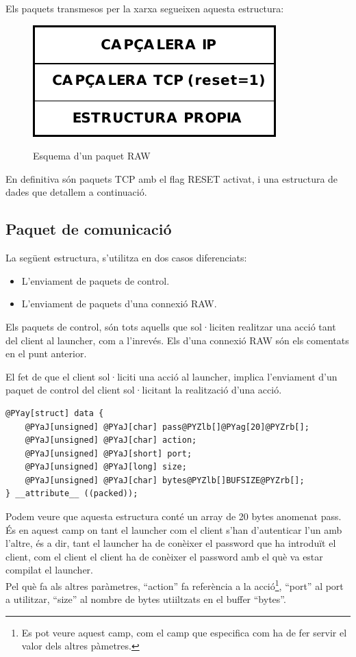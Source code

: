 Els paquets transmesos per la xarxa segueixen aquesta estructura: \\

\begin{figure}[htp]
    \centering
    \includegraphics[scale=1,keepaspectratio]{diagrames/solutionDesignPacketStructure.pdf} \\
    \caption{Esquema d'un paquet RAW}
    \label{fig:packetScheme}
\end{figure}

En definitiva són paquets TCP amb el flag RESET activat, i una estructura de dades que detallem a continuació.

\subsection{Paquet de comunicació}

La següent estructura, s'utilitza en dos casos diferenciats:
\begin{itemize}
    \item L'enviament de paquets de control.
    \item L'enviament de paquets d'una connexió RAW.
\end{itemize}

Els paquets de control, són tots aquells que sol·liciten realitzar una acció tant del client al launcher, com a l'inrevés.
Els d'una connexió RAW són els comentats en el punt anterior.

El fet de que el client sol·liciti una acció al launcher, implica l'enviament d'un paquet de control del client sol·licitant
la realització d'una acció. 

\begin{Verbatim}[commandchars=@\[\]]
@PYay[struct] data {
    @PYaJ[unsigned] @PYaJ[char] pass@PYZlb[]@PYag[20]@PYZrb[];
    @PYaJ[unsigned] @PYaJ[char] action;
    @PYaJ[unsigned] @PYaJ[short] port;
    @PYaJ[unsigned] @PYaJ[long] size;
    @PYaJ[unsigned] @PYaJ[char] bytes@PYZlb[]BUFSIZE@PYZrb[];
} __attribute__ ((packed));
\end{Verbatim}

Podem veure que aquesta estructura conté un array de 20 bytes anomenat pass. És en aquest camp on tant el launcher
com el client s'han d'autenticar l'un amb l'altre, és a dir, tant el launcher ha de conèixer el password que ha introduït 
el client, com el client el client ha de conèixer el password amb el què va estar compilat el launcher.\\

Pel què fa als altres paràmetres, ``action'' fa referència a la acció\footnote{Es pot 
veure aquest camp, com el camp que especifica com ha de fer servir el valor dels altres pàmetres.}, ``port'' al port a 
utilitzar, ``size'' al nombre de bytes utiiltzats en el buffer ``bytes''.

